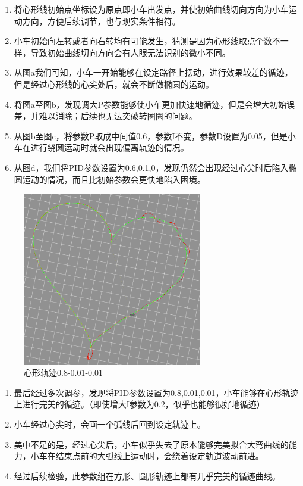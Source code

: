 \documentclass{xjtureport}
\begin{document}
\begin{enumerate}
    \item 将心形线初始点坐标设为原点即小车出发点，并使初始曲线切向方向为小车运动方向，方便后续调节，也与现实条件相符。
    \item 小车初始向左转或者向右转均有可能发生，猜测是因为心形线取点个数不一样，导致初始曲线切向方向会有人眼无法识别的微小不同。
    \item 从图a我们可知，小车一开始能够在设定路径上摆动，进行效果较差的循迹，但是经过心形线的心尖处后，就会不断做椭圆的运动。
    \item 将图a至图b，发现调大P参数能够使小车更加快速地循迹，但是会增大初始误差，并难以消除；后续也无法突破转圈圈的问题。
    \item 从图b至图c，将参数P取成中间值0.6，参数I不变，参数D设置为0.05，但是小车在进行绕圆运动时就会出现偏离轨迹的情况。
    \item 从图d，我们将PID参数设置为0.6,0.1,0，发现仍然会出现经过心尖时后陷入椭圆运动的情况，而且比初始参数会更快地陷入困境。
\end{enumerate}

\begin{figure}[H]
    \centering
    \includegraphics[width=0.7\textwidth]{figures/heart08001001.png}
    \caption{心形轨迹0.8-0.01-0.01}
\end{figure}
\begin{enumerate}
    \item 最后经过多次调参，发现将PID参数设置为0.8,0.01,0.01，小车能够在心形轨迹上进行完美的循迹。（即使增大I参数为0.2，似乎也能够很好地循迹）
    \item 小车经过心尖时，会画一个弧线后回到设定轨迹上。
    \item 美中不足的是，经过心尖后，小车似乎失去了原本能够完美拟合大弯曲线的能力，小车在结束点前的大弧线上运动时，会绕着设定轨道波动前进。
    \item 经过后续检验，此参数组在方形、圆形轨迹上都有几乎完美的循迹曲线。
\end{enumerate}
\end{document}
